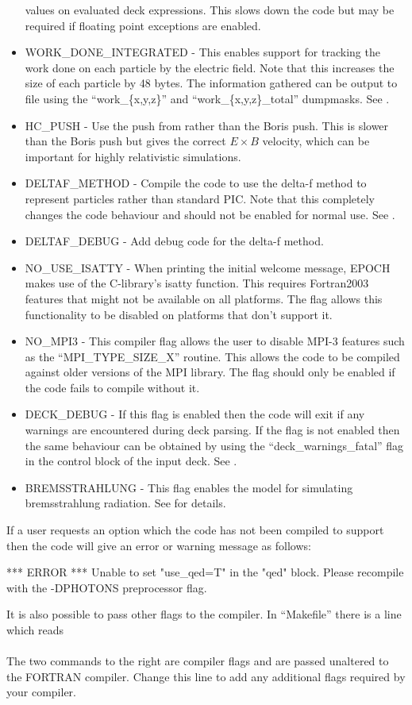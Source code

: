\begin{itemize}
  values on evaluated deck expressions.
  This slows down the code but may be required if floating point exceptions
  are enabled.
\item WORK\_DONE\_INTEGRATED - This enables support for tracking the work done
  on each particle by the electric field. Note that this increases the size
  of each particle by 48 bytes. The information gathered can be output to
  file using the ``work\_\{x,y,z\}'' and ``work\_\{x,y,z\}\_total'' dumpmasks.
  See .
\item HC\_PUSH - Use the push from \citet{Higuera_Cary_2017}
  rather than the Boris push.
  This is slower than the Boris push but gives the correct $E\times B$
  velocity, which can be important for highly relativistic simulations.
\item DELTAF\_METHOD - Compile the code to use the delta-f method to represent
  particles rather than standard PIC. Note that this completely changes the
  code behaviour and should not be enabled for normal use. See .
\item DELTAF\_DEBUG - Add debug code for the delta-f method.
\item NO\_USE\_ISATTY - When printing the initial welcome message, EPOCH makes
  use of the C-library's isatty function. This requires Fortran2003 features
  that might not be available on all platforms. The flag allows this
  functionality to be disabled on platforms that don't support it.
\item NO\_MPI3 - This compiler flag allows the user to disable MPI-3 features
  such as the ``MPI\_TYPE\_SIZE\_X'' routine. This allows the code to be
  compiled against older versions of the MPI library. The flag should only be
  enabled if the code fails to compile without it.
\item DECK\_DEBUG - If this flag is enabled then the code will exit if any
  warnings are encountered during deck parsing. If the flag is not enabled then
  the same behaviour can be obtained by using the ``deck\_warnings\_fatal''
  flag in the control block of the input deck. See .
\item BREMSSTRAHLUNG - This flag enables the model for simulating
  bremsstrahlung radiation. See  for details.
\end{itemize}

If a user requests an option which the code has not been compiled to support
then the code will give an error or warning message as follows:
\begin{boxverbatim}
 *** ERROR ***
 Unable to set "use_qed=T" in the "qed" block.
 Please recompile with the -DPHOTONS preprocessor flag.
\end{boxverbatim}
It is also possible to pass other flags to the compiler. In ``Makefile'' there
is a line which reads\\
\indent{}\\
The two commands to the right are compiler flags and are passed unaltered to
the FORTRAN compiler. Change this line to add any additional flags required by
your compiler.

